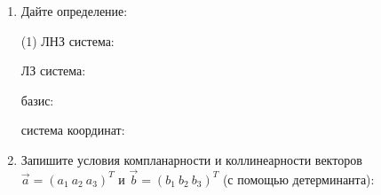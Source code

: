 \begin{enumerate}
    \item Дайте определение:
    \begin{tasks}(1)
        \task ЛНЗ система:\ \hrulefill\par\hrulefill\par\hrulefill
        \task ЛЗ система:\ \hrulefill\par\hrulefill\par\hrulefill
        \task базис:\ \hrulefill\par\hrulefill\par\hrulefill\par\hrulefill
        \task система координат:\ \hrulefill\par\hrulefill\par\hrulefill
    \end{tasks}
    
    \item Запишите условия компланарности и коллинеарности векторов $\vec a = (a_1\ a_2\ a_3)^T$ и $\vec b = (b_1\ b_2\ b_3)^T$ (с помощью детерминанта):
    \vspace{5cm}
    

\end{enumerate}
